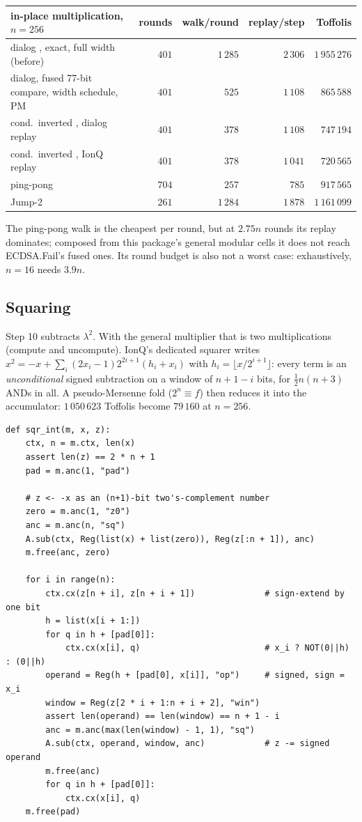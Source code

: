 \documentclass[11pt]{article}
\theoremstyle{plain}
\theoremstyle{remark}
\begin{document}
\begin{center}\small
\begin{tabular}{lrrrr}
\toprule
in-place multiplication, $n=256$ & rounds & walk/round & replay/step & Toffolis\\
\midrule
dialog \cite{ec:schrott26}, exact, full width (before) & $401$ & $1\,285$ & $2\,306$ & $1\,955\,276$\\
dialog, fused 77-bit compare, width schedule, PM & $401$ & $525$ & $1\,108$ & $865\,588$\\
cond.\ inverted \cite{ec:ionq26}, dialog replay & $401$ & $378$ & $1\,108$ & $747\,194$\\
cond.\ inverted \cite{ec:ionq26}, IonQ replay & $401$ & $378$ & $1\,041$ & $720\,565$\\
ping-pong \cite{ec:ecdsafail26} & $704$ & $257$ & $785$ & $917\,565$\\
Jump-2 \cite{ec:ecdsafail26} & $261$ & $1\,284$ & $1\,878$ & $1\,161\,099$\\
\bottomrule
\end{tabular}
\end{center}

The ping-pong walk is the cheapest per round, but at $2.75n$ rounds its replay dominates; composed
from this package's general modular cells it does not reach ECDSA.Fail's fused ones. Its round
budget is also not a worst case: exhaustively, $n=16$ needs $3.9n$.

\subsection{Squaring}

Step 10 subtracts $\lambda^2$. With the general multiplier that is two multiplications (compute and
uncompute). IonQ's dedicated squarer writes $x^2=-x+\sum_i(2x_i-1)2^{2i+1}(h_i+x_i)$ with
$h_i=\lfloor x/2^{i+1}\rfloor$: every term is an \emph{unconditional} signed subtraction on a window
of $n+1-i$ bits, for $\tfrac12n(n+3)$ ANDs in all. A pseudo-Mersenne fold ($2^n\equiv f$) then
reduces it into the accumulator: $1\,050\,623$ Toffolis become $79\,160$ at $n=256$.
\begin{lstlisting}
def sqr_int(m, x, z):
    ctx, n = m.ctx, len(x)
    assert len(z) == 2 * n + 1
    pad = m.anc(1, "pad")

    # z <- -x as an (n+1)-bit two's-complement number
    zero = m.anc(1, "z0")
    anc = m.anc(n, "sq")
    A.sub(ctx, Reg(list(x) + list(zero)), Reg(z[:n + 1]), anc)
    m.free(anc, zero)

    for i in range(n):
        ctx.cx(z[n + i], z[n + i + 1])              # sign-extend by one bit
        h = list(x[i + 1:])
        for q in h + [pad[0]]:
            ctx.cx(x[i], q)                         # x_i ? NOT(0||h) : (0||h)
        operand = Reg(h + [pad[0], x[i]], "op")     # signed, sign = x_i
        window = Reg(z[2 * i + 1:n + i + 2], "win")
        assert len(operand) == len(window) == n + 1 - i
        anc = m.anc(max(len(window) - 1, 1), "sq")
        A.sub(ctx, operand, window, anc)            # z -= signed operand
        m.free(anc)
        for q in h + [pad[0]]:
            ctx.cx(x[i], q)
    m.free(pad)
\end{lstlisting}
\end{document}
